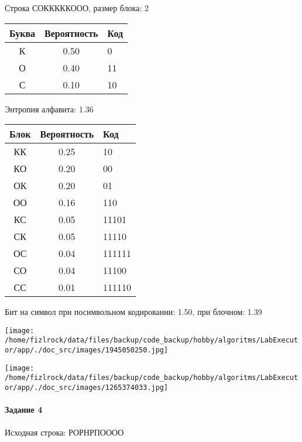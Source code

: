 \documentclass[a4paper, 12pt]{article}
\begin{document}
Строка СОКККККООО, размер блока: 2
\begin{center}
 \begin{tabular}{ |c|c|l| } 
  \hline
     Буква & Вероятность & Код\\ \hline
К & 0.50 & 0\\\hline
О & 0.40 & 11\\\hline
С & 0.10 & 10
\\ \hline \end{tabular}
\end{center}
Энтропия алфавита: 1.36
\begin{center}
 \begin{tabular}{ |c|c|l| } 
  \hline
     Блок & Вероятность & Код\\ \hline
КК & 0.25 & 10\\\hline
КО & 0.20 & 00\\\hline
ОК & 0.20 & 01\\\hline
ОО & 0.16 & 110\\\hline
КС & 0.05 & 11101\\\hline
СК & 0.05 & 11110\\\hline
ОС & 0.04 & 111111\\\hline
СО & 0.04 & 11100\\\hline
СС & 0.01 & 111110
\\ \hline \end{tabular}
\end{center}
Бит на символ при посимвольном кодировании: 1.50, при блочном: 1.39

\texttt{[image: /home/fizlrock/data/files/backup/code\_backup/hobby/algoritms/LabExecutor/app/./doc\_src/images/1945050250.jpg]}

\texttt{[image: /home/fizlrock/data/files/backup/code\_backup/hobby/algoritms/LabExecutor/app/./doc\_src/images/1265374033.jpg]}
\paragraph{Задание 4}


Исходная строка: РОРНРПОООО
\end{document}
